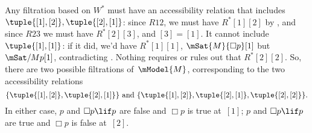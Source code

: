\documentclass[../../../include/open-logic-section]{subfiles}
\begin{document}
\begin{ex}
  Any filtration based on $W^*$ must have an accessibility relation
  that includes $\tuple{[1], [2]}, \tuple{[2],[1]}$: since $R12$, we
  must have $R^*[1][2]$ by
  , and
  since $R23$ we must have $R^*[2][3]$, and $[3]=[1]$. It cannot
  include $\tuple{[1],[1]}$: if it did, we'd have $R^*[1][1]$,
  $\mSat{M}{\Box p}[1]$ but $\mSat/{M}{p}[1]$, contradicting
  . Nothing requires or rules out that
  $R^*[2][2]$. So, there are two possible filtrations of~$\mModel{M}$,
  corresponding to the two accessibility relations
  \[
  \{\tuple{[1],[2]}, \tuple{[2],[1]}\} \text{ and }
  \{\tuple{[1],[2]}, \tuple{[2],[1]}, \tuple{[2],[2]}\}.
  \]
  In either case, $p$ and $\Box p \lif p$ are false and $\Box p$ is
  true at~$[1]$; $p$ and $\Box p \lif p$ are true and $\Box p$ is
  false at~$[2]$.
\end{ex}
\end{document}

